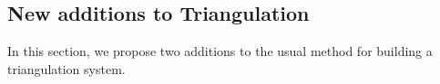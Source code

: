 \documentclass[11pt]{article}
\begin{document}
\subsection{New additions to Triangulation}
In this section, we propose two additions to the usual method for building a triangulation system.

\end{document}
